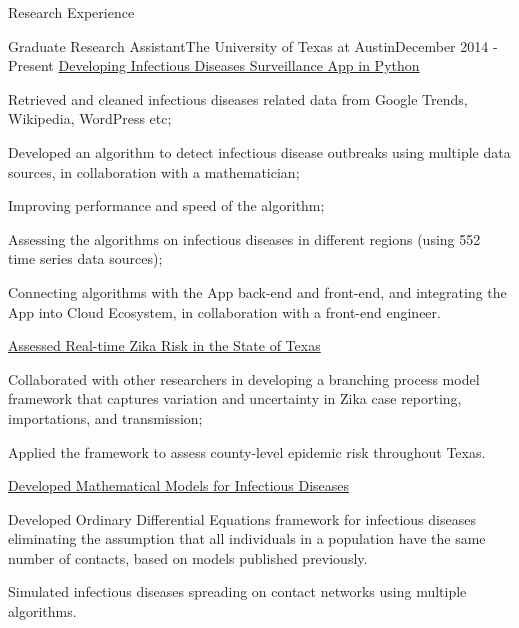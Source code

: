 \documentclass{my_resume} %
\begin{document}

\begin{rSection}{Research Experience}

\begin{rSubsection}{Graduate Research Assistant}{The
    University of Texas at Austin}{December 2014 - Present}
  \underline{Developing Infectious Diseases Surveillance App in Python}
  \item Retrieved and cleaned infectious diseases related data from Google
    Trends, Wikipedia, WordPress etc;
  \item Developed an algorithm to detect infectious disease outbreaks using
    multiple data sources, in collaboration with a mathematician;
  \item Improving performance and speed of the algorithm;
  \item Assessing the algorithms on infectious diseases in different regions
    (using 552 time series data sources);
  \item Connecting algorithms with the App back-end and front-end, and
    integrating the App into Cloud Ecosystem, in collaboration with a front-end
    engineer.

  \underline{Assessed Real-time Zika Risk in the State of Texas}
  \item Collaborated with other researchers in developing a branching process
    model framework that captures variation and uncertainty in Zika case
    reporting, importations, and transmission;
  \item Applied the framework to assess county-level epidemic risk throughout
    Texas.

  \underline{Developed Mathematical Models for Infectious Diseases}
  \item Developed Ordinary Differential Equations framework for infectious diseases
    eliminating the assumption that all individuals in a population have the
    same number of contacts, based on models published previously.
  \item Simulated infectious diseases spreading on contact networks using
    multiple algorithms.
\end{rSubsection}
\end{rSection}
\end{document}
